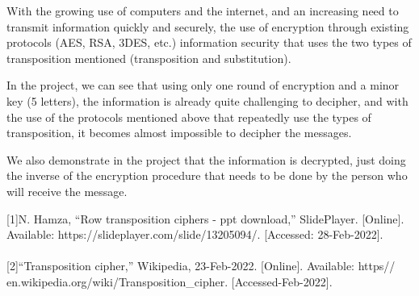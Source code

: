 \documentclass[twoside,twocolumn]{article}
\begin{document}
With the growing use of computers and the internet, and an increasing need to transmit information quickly and securely, the use of encryption through existing protocols (AES, RSA, 3DES, etc.) information security that uses the two types of transposition mentioned (transposition and substitution).

In the project, we can see that using only one round of encryption and a minor key (5 letters), the information is already quite challenging to decipher, and with the use of the protocols mentioned above that repeatedly use the types of transposition, it becomes almost impossible to decipher the messages.

We also demonstrate in the project that the information is decrypted, just doing the inverse of the encryption procedure that needs to be done by the person who will receive the message. \\ 

\vspace*{1.5cm}
\begin{thebibliography}{} %

\footnotesize[1]N. Hamza, “Row transposition ciphers - ppt download,” SlidePlayer. [Online]. Available: https://slideplayer.com/slide/13205094/. [Accessed: 28-Feb-2022].  \\ \\

\footnotesize[2]“Transposition cipher,” Wikipedia, 23-Feb-2022. [Online]. Available: https\:// en.wikipedia.org/wiki/Transposition\_cipher. [Accessed-Feb-2022]. \\ \\


 
\end{thebibliography}


\end{document}
